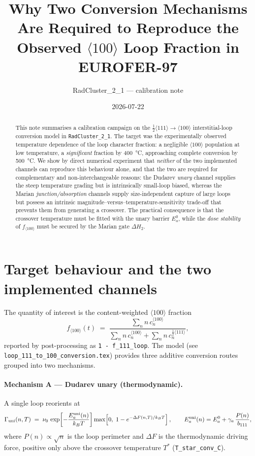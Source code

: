\documentclass[11pt,a4paper]{article}
\title{Why Two Conversion Mechanisms Are Required to Reproduce the\\
       Observed $\langle100\rangle$ Loop Fraction in EUROFER-97}
\author{RadCluster\_2\_1 --- calibration note}
\date{2026-07-22}
\newcommand{\fhkl}{f_{\langle100\rangle}}
\newcommand{\bv}{\tfrac12\langle111\rangle}
\begin{document}
\maketitle

\begin{abstract}
This note summarises a calibration campaign on the $\bv\!\to\!\langle100\rangle$
interstitial-loop conversion model in \texttt{RadCluster\_2\_1}. The target was the
experimentally observed temperature dependence of the loop character fraction: a
negligible $\langle100\rangle$ population at low temperature, a \emph{significant}
fraction by \SI{400}{\celsius}, approaching complete conversion by
\SI{500}{\celsius}. We show by direct numerical experiment that \emph{neither} of
the two implemented channels can reproduce this behaviour alone, and that the two
are required for complementary and non-interchangeable reasons: the Dudarev
\emph{unary} channel supplies the steep temperature grading but is intrinsically
small-loop biased, whereas the Marian \emph{junction/absorption} channels supply
size-independent capture of large loops but possess an intrinsic
magnitude--versus--temperature-sensitivity trade-off that prevents them from
generating a crossover. The practical consequence is that the crossover
temperature must be fitted with the unary barrier $E_a^0$, while the
\emph{dose stability} of $\fhkl$ must be secured by the Marian gate $\Delta H_2$.
\end{abstract}

\section{Target behaviour and the two implemented channels}

The quantity of interest is the content-weighted $\langle100\rangle$ fraction
\begin{equation}
  \fhkl(t) \;=\; \frac{\sum_n n\,c_n^{\langle100\rangle}}
                      {\sum_n n\,c_n^{\langle100\rangle} + \sum_n n\,c_n^{\bv}},
\end{equation}
reported by post-processing as \texttt{1 - f\_111\_loop}. The model
(see \texttt{loop\_111\_to\_100\_conversion.tex}) provides three additive
conversion routes grouped into two mechanisms.

\paragraph{Mechanism A --- Dudarev unary (thermodynamic).}
A single loop reorients at
\begin{equation}
  \Gamma_{\rm uni}(n,T) \;=\; \nu_0\,
  \exp\!\left[-\frac{E_a^{\rm uni}(n)}{k_BT}\right]
  \max\!\left[0,\;1-e^{-\Delta F(n,T)/k_BT}\right],
  \qquad
  E_a^{\rm uni}(n) = E_a^0 + \gamma_a\,\frac{P(n)}{b_{111}},
  \label{eq:uni}
\end{equation}
where $P(n)\propto\sqrt{n}$ is the loop perimeter and $\Delta F$ is the
thermodynamic driving force, positive only above the crossover temperature
$T^\ast$ (\texttt{T\_star\_conv\_C}).
\end{document}
